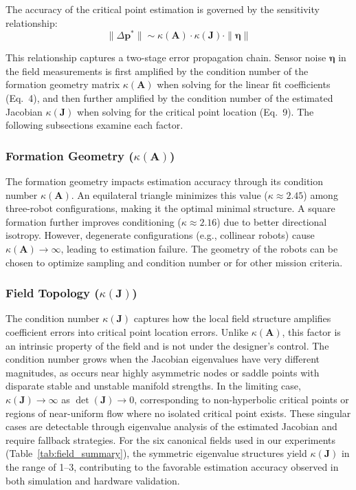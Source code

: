 \documentclass[lettersize,journal]{IEEEtran}
\begin{document}
The accuracy of the critical point estimation is governed by the sensitivity relationship:
\begin{equation}
\label{eq:sensitivity}
\|\Delta\mathbf{p}^*\| \sim \kappa(\mathbf{A}) \cdot \kappa(\mathbf{J}) \cdot \|\boldsymbol{\eta}\|
\end{equation}

This relationship captures a two-stage error propagation chain. Sensor noise $\boldsymbol{\eta}$ in the field measurements is first amplified by the condition number of the formation geometry matrix $\kappa(\mathbf{A})$ when solving for the linear fit coefficients (Eq.~4), and then further amplified by the condition number of the estimated Jacobian $\kappa(\mathbf{J})$ when solving for the critical point location (Eq.~9). The following subsections examine each factor.

\subsubsection{Formation Geometry ($\kappa(\mathbf{A})$)}
The formation geometry impacts estimation accuracy through its condition number $\kappa(\mathbf{A})$. An equilateral triangle minimizes this value ($\kappa \approx 2.45$) among three-robot configurations, making it the optimal minimal structure. A square formation further improves conditioning ($\kappa \approx 2.16$) due to better directional isotropy. However, degenerate configurations (e.g., collinear robots) cause $\kappa(\mathbf{A}) \to \infty$, leading to estimation failure. The geometry of the robots can be chosen to optimize sampling and condition number or for other mission criteria.

\subsubsection{Field Topology ($\kappa(\mathbf{J})$)}
The condition number $\kappa(\mathbf{J})$ captures how the local field structure amplifies coefficient errors into critical point location errors. Unlike $\kappa(\mathbf{A})$, this factor is an intrinsic property of the field and is not under the designer's control. The condition number grows when the Jacobian eigenvalues have very different magnitudes, as occurs near highly asymmetric nodes or saddle points with disparate stable and unstable manifold strengths. In the limiting case, $\kappa(\mathbf{J}) \to \infty$ as $\det(\mathbf{J}) \to 0$, corresponding to non-hyperbolic critical points or regions of near-uniform flow where no isolated critical point exists. These singular cases are detectable through eigenvalue analysis of the estimated Jacobian and require fallback strategies. For the six canonical fields used in our experiments (Table~\ref{tab:field_summary}), the symmetric eigenvalue structures yield $\kappa(\mathbf{J})$ in the range of 1--3, contributing to the favorable estimation accuracy observed in both simulation and hardware validation.
\end{document}
